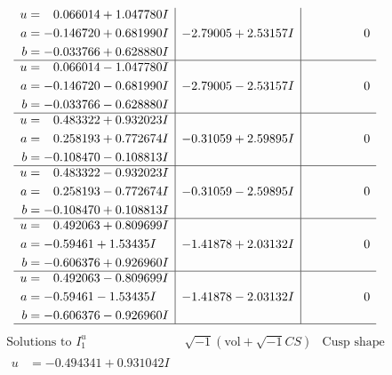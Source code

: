 \documentclass[1p]{elsarticle_modified}
\theoremstyle{definition}
\newcommand{\I}{\sqrt{-1}}
\begin{document}
$$\begin{array}{c|c|c}
\begin{aligned}
u &= \phantom{-}0.066014 + 1.047780 I \\
a &= -0.146720 + 0.681990 I \\
b &= -0.033766 + 0.628880 I\end{aligned}
 & -2.79005 + 2.53157 I & \phantom{-0.000000 } 0 \\ \hline\begin{aligned}
u &= \phantom{-}0.066014 - 1.047780 I \\
a &= -0.146720 - 0.681990 I \\
b &= -0.033766 - 0.628880 I\end{aligned}
 & -2.79005 - 2.53157 I & \phantom{-0.000000 } 0 \\ \hline\begin{aligned}
u &= \phantom{-}0.483322 + 0.932023 I \\
a &= \phantom{-}0.258193 + 0.772674 I \\
b &= -0.108470 - 0.108813 I\end{aligned}
 & -0.31059 + 2.59895 I & \phantom{-0.000000 } 0 \\ \hline\begin{aligned}
u &= \phantom{-}0.483322 - 0.932023 I \\
a &= \phantom{-}0.258193 - 0.772674 I \\
b &= -0.108470 + 0.108813 I\end{aligned}
 & -0.31059 - 2.59895 I & \phantom{-0.000000 } 0 \\ \hline\begin{aligned}
u &= \phantom{-}0.492063 + 0.809699 I \\
a &= -0.59461 + 1.53435 I \\
b &= -0.606376 + 0.926960 I\end{aligned}
 & -1.41878 + 2.03132 I & \phantom{-0.000000 } 0 \\ \hline\begin{aligned}
u &= \phantom{-}0.492063 - 0.809699 I \\
a &= -0.59461 - 1.53435 I \\
b &= -0.606376 - 0.926960 I\end{aligned}
 & -1.41878 - 2.03132 I & \phantom{-0.000000 } 0\\
 \hline 
 \end{array}$$\newpage$$\begin{array}{c|c|c}  
\text{Solutions to }I^u_{1}& \I (\text{vol} + \sqrt{-1}CS) & \text{Cusp shape}\\
 \hline 
\begin{aligned}
u &= -0.494341 + 0.931042 I \\

\end{aligned}
\end{array}$$
\end{document}
